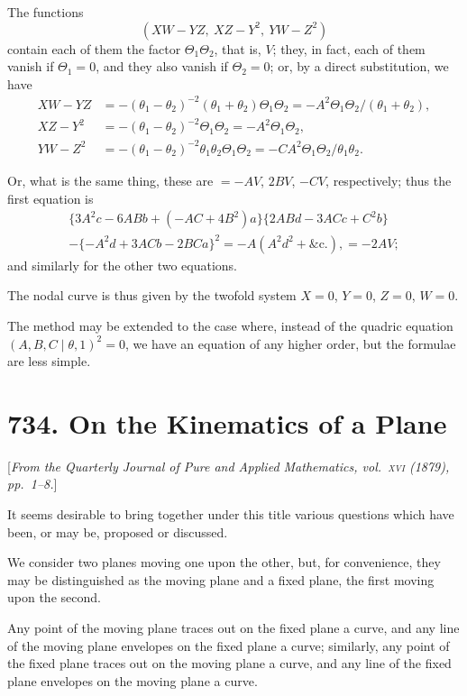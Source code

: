 \documentclass[11pt,a4paper]{book}
\begin{document}
The functions
\[
(XW-YZ,\ XZ-Y^2,\ YW-Z^2)
\]
contain each of them the factor $\Theta_1\Theta_2$, that is, $V$; they, in fact, each
of them vanish if $\Theta_1=0$, and they also vanish if $\Theta_2=0$;
or, by a direct substitution, we have
\begin{align*}
XW-YZ &= -(\theta_1-\theta_2)^{-2}(\theta_1+\theta_2)\Theta_1\Theta_2
= -A^2\Theta_1\Theta_2/(\theta_1+\theta_2),\\
XZ-Y^2 &= -(\theta_1-\theta_2)^{-2}\Theta_1\Theta_2 = -A^2\Theta_1\Theta_2,\\
YW-Z^2 &= -(\theta_1-\theta_2)^{-2}\theta_1\theta_2\Theta_1\Theta_2
= -C A^2\Theta_1\Theta_2/\theta_1\theta_2.
\end{align*}

Or, what is the same thing, these are $=-AV$, $2BV$, $-CV$,
respectively; thus the first equation is
\begin{multline*}
\{3A^2c-6ABb+(-AC+4B^2)a\}\{2ABd-3ACc+C^2b\}\\
-\{-A^2d+3ACb-2BCa\}^2 = -A(A^2d^2+\&\text{c.}), = -2AV;
\end{multline*}
and similarly for the other two equations.

The nodal curve is thus given by the twofold system $X=0$, $Y=0$,
$Z=0$, $W=0$.

The method may be extended to the case where, instead of the quadric
equation $(A,B,C\mid\theta,1)^2=0$, we have an equation of any higher
order, but the formulae are less simple.

\newpage
\section*{734. On the Kinematics of a Plane}

[\textit{From the Quarterly Journal of Pure and Applied Mathematics, vol.~\textsc{xvi} (1879),
pp.~1--8.}]

It seems desirable to bring together under this title various questions
which have been, or may be, proposed or discussed.

We consider two planes moving one upon the other, but, for convenience,
they may be distinguished as the moving plane and a fixed plane, the first
moving upon the second.

Any point of the moving plane traces out on the fixed plane a curve,
and any line of the moving plane envelopes on the fixed plane a curve;
similarly, any point of the fixed plane traces out on the moving plane a
curve, and any line of the fixed plane envelopes on the moving plane a curve.
\end{document}
